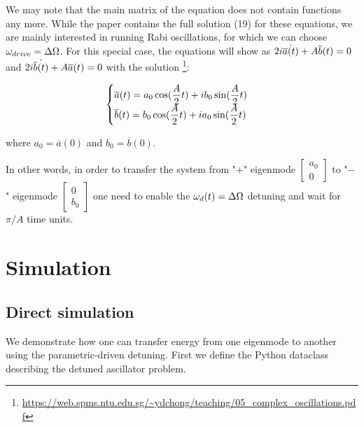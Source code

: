 We may note that the main matrix of the equation does not contain functions any more. While the
paper contains the full solution (19) for these equations, we are mainly interested in running Rabi
oscillations, for which we can choose $\omega_{drive} = \Delta\Omega$. For this special case, the equations will show
as $2i \dot{\overline{a}(t)} + A \overline{b}(t) = 0$ and $2i \dot{\overline{b}(t)} + A \overline{a}(t) = 0$ with the solution
\footnote{\url{https://web.spms.ntu.edu.sg/~ydchong/teaching/05_complex_oscillations.pdf}}:

\[
  \begin{cases}
    \displaystyle \overline{a}(t) = a_0 \cos(\frac{A}{2}t) + i b_0 \sin(\frac{A}{2}t) \\
    \displaystyle \overline{b}(t) = b_0 \cos(\frac{A}{2}t) + i a_0 \sin(\frac{A}{2}t)
  \end{cases}
\]

where $a_0 = \overline{a}(0)$ and $b_0 = \overline{b}(0)$.

In other words, in order to transfer the system from "$+$" eigenmode $\begin{bmatrix}a_0 \\
0\end{bmatrix}$ to "$-$" eigenmode $\begin{bmatrix}0 \\ b_0\end{bmatrix}$ one need to enable the
$\omega_d(t) = \Delta\Omega$ detuning and wait for $\pi/A$ time units.

\section{Simulation}

\subsection{Direct simulation}
We demonstrate how one can transfer energy from one eigenmode to another using the parametric-driven
detuning. First we define the Python dataclass describing the detuned ascillator problem.


